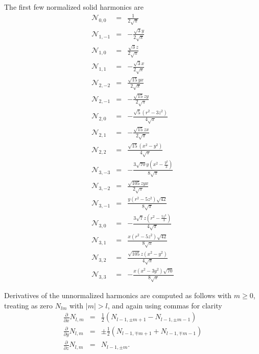 \documentclass[12pt]{article}
\newcommand{\N}{\mathcal{N}}
\begin{document}
The first few normalized solid harmonics are
\begin{eqnarray}
\N_{0, 0} & = &  \frac{1}{2 \sqrt{\pi}}  \nonumber \\
\N_{1, -1} & = &  -\frac{\sqrt{3} y}{2 \sqrt{\pi}} \nonumber \\
\N_{1, 0} & = &  \frac{\sqrt{3} z}{2 \sqrt{\pi}} \nonumber \\
\N_{1, 1} & = &  -\frac{\sqrt{3} x}{2 \sqrt{\pi}} \nonumber \\
\N_{2, -2} & = &  \frac{\sqrt{15} y x}{2 \sqrt{\pi}} \nonumber \\
\N_{2, -1} & = &  -\frac{\sqrt{15} z y}{2 \sqrt{\pi}} \nonumber \\
\N_{2, 0} & = &  -\frac{\sqrt{5} \left(r^{2}-3 z^{2}\right)}{4 \sqrt{\pi}} \nonumber \\
\N_{2, 1} & = &  -\frac{\sqrt{15} z x}{2 \sqrt{\pi}} \nonumber \\
\N_{2, 2} & = &  \frac{\sqrt{15} \left(x^{2}-y^{2}\right)}{4 \sqrt{\pi}} \nonumber \\
\N_{3, -3} & = &  -\frac{3 \sqrt{70} y \left(x^{2}-\frac{y^{2}}{3}\right)}{8 \sqrt{\pi}} \nonumber \\
\N_{3, -2} & = &  \frac{\sqrt{105} z y x}{2 \sqrt{\pi}} \nonumber \\
\N_{3, -1} & = &  \frac{y \left(r^{2}-5 z^{2}\right) \sqrt{42}}{8 \sqrt{\pi}} \nonumber \\
\N_{3, 0} & = &  -\frac{3 \sqrt{7} z \left(r^{2}-\frac{5 z^{2}}{3}\right)}{4 \sqrt{\pi}}  \nonumber \\
\N_{3, 1} & = &  \frac{x \left(r^{2}-5 z^{2}\right) \sqrt{42}}{8 \sqrt{\pi}} \nonumber \\
\N_{3, 2} & = &  \frac{\sqrt{105} z \left(x^{2}-y^{2}\right)}{4 \sqrt{\pi}} \nonumber \\
\N_{3, 3} & = &  -\frac{x \left(x^{2}-3 y^{2}\right) \sqrt{70}}{8 \sqrt{\pi}} \nonumber
\end{eqnarray}

Derivatives of the unnormalized harmonics are computed as follows with $m\ge 0$, treating as zero $N_{lm}$ with $|m|>l$, and again using commas for clarity
\begin{eqnarray}
  \frac{\partial}{\partial x} N_{l,m} & = & \frac{1}{2}\left( N_{l-1,\pm m+1} - N_{l-1,\pm m-1} \right) \nonumber \\
  \frac{\partial}{\partial y} N_{l,m} & = & \pm \frac{1}{2}\left( N_{l-1,\mp m+1} + N_{l-1,\mp m-1} \right) \nonumber \\
  \frac{\partial}{\partial z} N_{l,m} & = & N_{l-1,\pm m} . \nonumber
\end{eqnarray}
 
\end{document}
